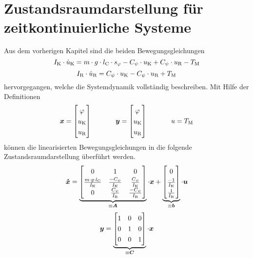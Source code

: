 \section{Zustandsraumdarstellung für zeitkontinuierliche Systeme}
Aus dem vorherigen Kapitel sind die beiden Bewegungsgleichungen 
\begin{equation}
I_{\text{K}} \cdot \dot{u}_{\text{K}} = m\cdot g\cdot l_{\text{C}}\cdot s_{\varphi} - C_{\psi}\cdot u_{\text{K}} + C_{\psi} \cdot u_{\text{R}} - T_{\text{M}}
\end{equation}
\begin{equation}
I_{\text{R}}\cdot \dot{u}_{\text{R}} = C_{\psi}\cdot u_{\text{K}} - C_{\psi}\cdot u_{\text{R}} + T_{\text{M}}
\end{equation}
hervorgegangen, welche die Systemdynamik vollständig beschreiben. Mit Hilfe der Definitionen
\begin{equation}
\bs{x} = \begin{bmatrix} \varphi \\ u\idx{K} \\ u\idx{R} \end{bmatrix}
\hspace{35pt}
\bs{y} = \begin{bmatrix} \varphi \\ u\idx{K} \\ u\idx{R} \end{bmatrix}
\hspace{35pt}
u = T\idx{M}
\end{equation}
können die linearisierten Bewegungsgleichungen in die folgende Zustandsraumdarstellung überführt werden.
\begin{equation}
\renewcommand*{\arraystretch}{1.3}
\bs{\dot{x}} = \underbrace{\begin{bmatrix}
0 & 1 & 0 
\\ 
\frac{m\cdot g\cdot l\idx{C}}{I\idx{K}} & \frac{-C_{\psi}}{I\idx{K}} & \frac{C_{\psi}}{I\idx{K}}
\\ 
0 & \frac{C_{\psi}}{I\idx{R}} & \frac{-C_{\psi}}{I\idx{R}}
\end{bmatrix}}_{\equiv \bs{A}} \cdot \bs{x}
+
\underbrace{\begin{bmatrix}
0 \\ \frac{-1}{I\idx{K}} \\ \frac{1}{I\idx{R}}
\end{bmatrix}}_{\equiv \bs{b}} \cdot \bs{u}
\end{equation}
\begin{equation}
\bs{y} = \underbrace{\begin{bmatrix}
1 & 0 & 0 \\ 0 & 1 & 0 \\ 0 & 0 & 1
\end{bmatrix}}_{\equiv \bs{C}} \cdot \bs{x}
\end{equation}
